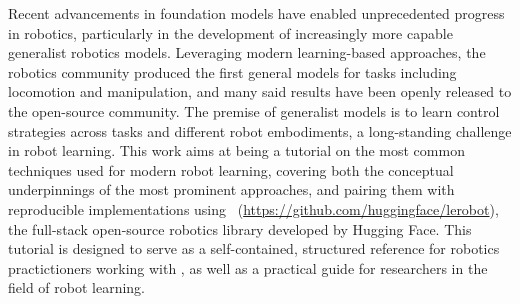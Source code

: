 Recent advancements in foundation models have enabled unprecedented progress in robotics, particularly in the development of increasingly more capable generalist robotics models.
Leveraging modern learning-based approaches, the robotics community produced the first general models for tasks including locomotion and manipulation, and many said results have been openly released to the open-source community.
The premise of generalist models is to learn control strategies across tasks and different robot embodiments, a long-standing challenge in robot learning.
This work aims at being a tutorial on the most common techniques used for modern robot learning, covering both the conceptual underpinnings of the most prominent approaches, and pairing them with reproducible implementations using \lerobot \ (\url{https://github.com/huggingface/lerobot}), the full-stack open-source robotics library developed by Hugging Face.
This tutorial is designed to serve as a self-contained, structured reference for robotics practictioners working with \lerobot, as well as a practical guide for researchers in the field of robot learning.